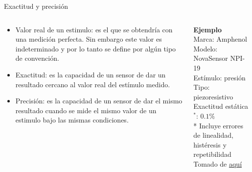 \documentclass[aspectratio=169]{beamer}
\begin{document}
\begin{frame}{Exactitud y precisión}
    \begin{columns}[c, onlytextwidth]
        \begin{column}{0.55\textwidth}
            \begin{itemize}
                \item Valor real de un estimulo: es el que se obtendría con una medición perfecta. Sin embargo este valor es indeterminado y por lo tanto se define por algún tipo de convención. 
                \item Exactitud: es la capacidad de un sensor de dar un resultado cercano al valor real del estímulo medido.
                \item Precisión: es la capacidad de un sensor de dar el mismo resultado cuando se mide el mismo valor de un estimulo bajo las mismas condiciones. 
            \end{itemize}
        \end{column}
        \begin{column}{0.40\textwidth}
            \textbf{Ejemplo}\\[4pt]
            Marca: Amphenol\\[4pt]
            Modelo: NovaSensor NPI-19\\[4pt]
            Estímulo: presión\\[4pt]
            Tipo: piezoresistivo\\[4pt]
            Exactitud estática$^*$: $0.1 \%$ \\[10pt]
            \tiny{* Incluye errores de linealidad, histéresis y repetibilidad}\\
            \tiny{Tomado de \href{https://f.hubspotusercontent40.net/hubfs/9035299/Product\%20Documents/AAS-920-298B-NovaSensor\%20NPI-19-REVISED-061714-web\%20(1).pdf}{aquí}}
        \end{column}
    \end{columns}
\end{frame}
\end{document}
